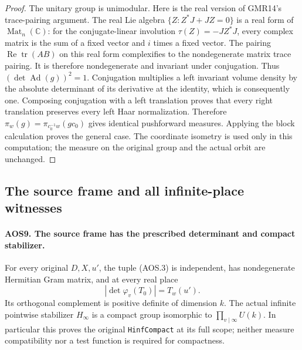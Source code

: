 \begin{proof}
The unitary group is unimodular.  Here is the real version of
GMR14's trace-pairing argument.  The real Lie algebra
$\{Z:Z^*J+JZ=0\}$ is a real form of
$\operatorname{Mat}_n(\mathbb C)$: for the conjugate-linear
involution $\tau(Z)=-JZ^*J$, every complex matrix is the sum of
a fixed vector and $i$ times a fixed vector.  The pairing
$\operatorname{Re}\operatorname{tr}(AB)$ on this real form
complexifies to the nondegenerate matrix trace pairing.  It is
therefore nondegenerate and invariant under conjugation.  Thus
$(\det\operatorname{Ad}(g))^2=1$.  Conjugation multiplies a
left invariant volume density by the absolute determinant of its
derivative at the identity, which is consequently one.  Composing
conjugation with a left translation proves that every right
translation preserves every left Haar normalization.  Therefore
$\pi_w(g)=\pi_{c_0^{-1}w}(gc_0)$ gives identical pushforward
measures.  Applying the block calculation proves the general case.
The coordinate isometry is used only in this computation; the
measure on the original group and the actual orbit are unchanged.
\end{proof}

\subsection{The source frame and all infinite-place witnesses}

\paragraph{AOS9. The source frame has the prescribed determinant and compact stabilizer.}
\label{claim:AOS9}
For every original $D,X,u'$, the tuple (AOS.3) is independent,
has nondegenerate Hermitian Gram matrix, and at every real place
\[
          |\det\varphi_v(T_0)|=T_w(u').
 \tag{AOS.23}
\]
Its orthogonal complement is positive definite of dimension $k$.
The actual infinite pointwise stabilizer $H_\infty$ is a compact
group isomorphic to $\prod_{v\mid\infty}U(k)$.  In particular this
proves the original \texttt{HinfCompact} at its full scope; neither
measure compatibility nor a test function is required for compactness.

